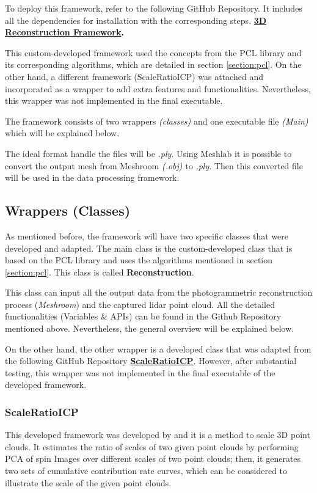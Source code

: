 \documentclass[12pt]{report}
\begin{document}
To deploy this framework, refer to the following GitHub Repository. It includes all the dependencies for installation with the corresponding steps. 
\textbf{\href{https://github.com/esteban-andrade/3D-Reconstructrion-Scanner} {3D Reconstruction Framework}.}

This custom-developed framework used the concepts from the PCL library and its corresponding algorithms, which are detailed in section \ref{section:pcl}.
On the other hand, a different framework (ScaleRatioICP) was attached and incorporated as a wrapper to add extra features and functionalities.
Nevertheless, this wrapper was not implemented in the final executable. 

The framework consists of two wrappers \textit{(classes)} and one executable file \textit{(Main)} which will be explained below.

The ideal format handle the files will be \textit{.ply}. Using Meshlab it is possible to convert the output mesh from Meshroom \textit{(.obj)} to \textit{.ply}.
Then this converted file will be used in the data processing framework. 




\subsection{Wrappers (Classes)}
As mentioned before, the framework will have two specific classes that were developed and adapted.
The main class is the custom-developed class that is based on the PCL library and uses the algorithms mentioned in section \ref{section:pcl}. This class is called \textbf{Reconstruction}.

This class can input all the output data from the photogrammetric reconstruction process (\textit{Meshroom}) and the captured lidar point cloud.
All the detailed functionalities (Variables \& APIs) can be found in the Github Repository mentioned above. Nevertheless, the general overview will be explained below. 

On the other hand, the other wrapper is a developed class that was adapted from the following GitHub Repository \textbf{\href{https://github.com/linbaowei/ScaleRatioICP} {ScaleRatioICP}}.
However, after substantial testing, this wrapper was not implemented in the final executable of the developed framework. 




\subsubsection{ScaleRatioICP}
This developed framework was developed by  and it is a method to scale 3D point clouds. 
It estimates the ratio of scales of two given point clouds by performing PCA of spin Images over different scales of two point clouds; then, it generates two sets of cumulative contribution rate curves, which can be considered
to illustrate the scale of the given point clouds. 
\end{document}
